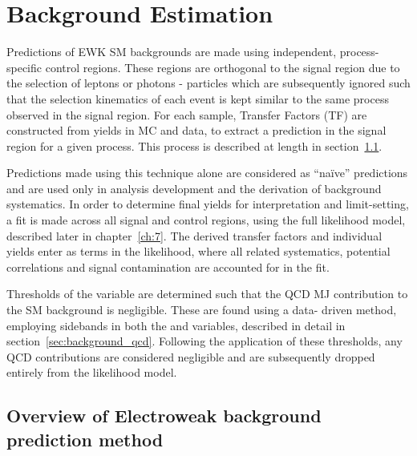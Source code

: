 \chapter{Background Estimation}
\label{ch:6}

\ifpdf
    \graphicspath{{Chapter6/Figs/Raster/}{Chapter6/Figs/PDF/}{Chapter6/Figs/}}
\else
    \graphicspath{{Chapter6/Figs/Vector/}{Chapter6/Figs/}}
\fi

Predictions of EWK SM backgrounds are made using independent, process-specific 
control regions. These regions are orthogonal to the signal region due to the 
selection of leptons or photons - particles which are subsequently ignored such 
that the selection kinematics of each event is kept similar to the same process 
observed in the signal region. For each sample, Transfer Factors (TF) are 
constructed from yields in MC and data, to extract a prediction in the signal 
region for a given process. This process is described at length in
section~\ref{sec:background_overview}.

Predictions made using this technique alone are considered as ``na\"{i}ve'' 
predictions and are used only in analysis development and the derivation of 
background systematics. In order to determine final yields for interpretation and 
limit-setting, a fit is made across all signal and control regions, using the 
full likelihood model, described later in chapter~\ref{ch:7}. The derived 
transfer factors and individual yields enter as terms in the likelihood, where 
all related systematics, potential correlations and signal contamination are
accounted for in the fit.

Thresholds of the \alphat variable are determined such that the QCD MJ 
contribution to the SM background is negligible. These are found using a data-
driven method, employing sidebands in both the \mhtmet and \alphat variables, 
described in detail in section~\ref{sec:background_qcd}. Following the 
application of these thresholds, any QCD contributions are considered negligible
and are subsequently dropped entirely from the likelihood model.

\section{Overview of Electroweak background prediction method}  %
\label{sec:background_overview}

